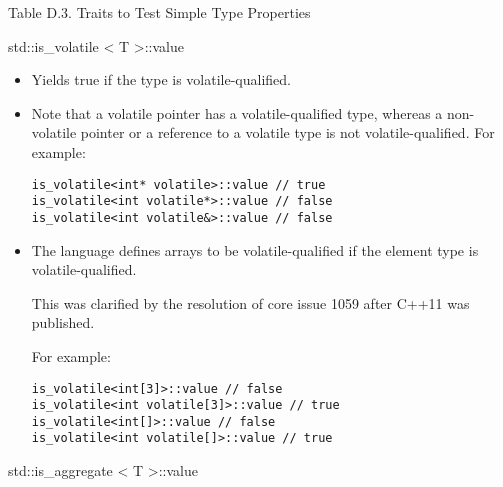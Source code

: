 \begin{center}
Table D.3. Traits to Test Simple Type Properties
\end{center}

std::is\_volatile < T >::value

\begin{itemize}
\item 
Yields true if the type is volatile-qualified.

\item 
Note that a volatile pointer has a volatile-qualified type, whereas a non-volatile pointer or a reference to a volatile type is not volatile-qualified. For example:

\begin{lstlisting}[style=styleCXX]
is_volatile<int* volatile>::value // true
is_volatile<int volatile*>::value // false
is_volatile<int volatile&>::value // false
\end{lstlisting}

\item 
The language defines arrays to be volatile-qualified if the element type is volatile-qualified.

\begin{tcolorbox}[colback=webgreen!5!white,colframe=webgreen!75!black]
\hspace*{0.75cm}This was clarified by the resolution of core issue 1059 after C++11 was published.
\end{tcolorbox}

For example:
\begin{lstlisting}[style=styleCXX]
is_volatile<int[3]>::value // false
is_volatile<int volatile[3]>::value // true
is_volatile<int[]>::value // false
is_volatile<int volatile[]>::value // true
\end{lstlisting}
\end{itemize}

std::is\_aggregate < T >::value

